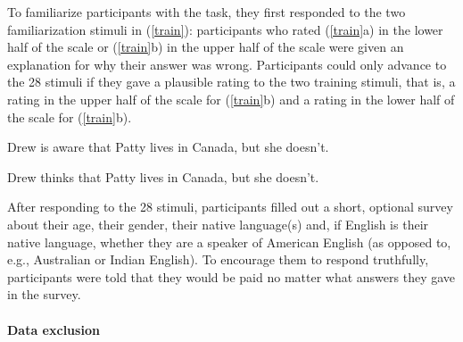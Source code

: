 \documentclass[11pt,fleqn]{article}
\newcommand{\6}{\mbox{$[\hspace*{-.6mm}[$}}
\newcommand{\9}{\mbox{$]\hspace*{-.6mm}]$}}
\begin{document}
{To familiarize participants with the task, they first responded to the two familiarization stimuli in (\ref{train}): participants who rated (\ref{train}a) in the lower half of the scale or (\ref{train}b) in the upper half of the scale were given an explanation for why their answer was wrong. Participants could only advance to the 28 stimuli if they gave a plausible rating to the two training stimuli, that is, a rating in the upper half of the scale for (\ref{train}b) and a rating in the lower half of the scale for (\ref{train}b).

\begin{exe}
\ex\label{train}
\begin{xlist}
\ex Drew is aware that Patty lives in Canada, but she doesn't.

\ex Drew thinks that Patty lives in Canada, but she doesn't.
\end{xlist}
\end{exe}

After responding to the 28 stimuli, participants filled out a short, optional survey about their age, their gender, their native language(s) and, if English is their native language, whether they are a speaker of American English (as opposed to, e.g., Australian or Indian English). To encourage them to respond truthfully, participants were told that they would be paid no matter what answers they gave in the survey.

\paragraph{Data exclusion}

}
\end{document}
